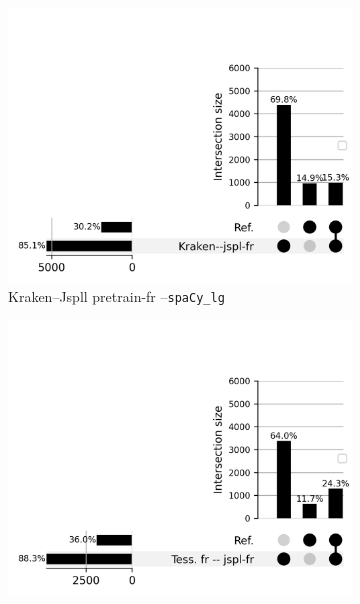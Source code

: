 \begin{figure}[h!]
    \begin{minipage}{6.5cm}
  \begin{subfigure}{0.8\textwidth}
  \includegraphics[width=1\textwidth]{IMAGES/ELTeC_INTERSECTIONS_spaCy3.5.1_12072024/DATA_ELTeC-fra_spaCy3.5.1_Kraken--jspl-fr_upsetplot.png} 
  \caption{Kraken--Jspll pretrain-fr --\texttt{spaCy\_lg}}
  \label{fig:ELTeCFRA_Kraken -- jspl-fr_spacy-lg-concat_intersection.png}
  \end{subfigure}
  \end{minipage}
  \begin{minipage}{6.5cm}
  \begin{subfigure}{0.8\textwidth}
  \includegraphics[width=1\textwidth]{IMAGES/ELTeC_INTERSECTIONS_spaCy3.5.1_12072024/DATA_ELTeC-fra_spaCy3.5.1_Tess. fr -- jspl-fr_upsetplot.png} 

\end{subfigure}
\end{minipage}
\end{figure}
